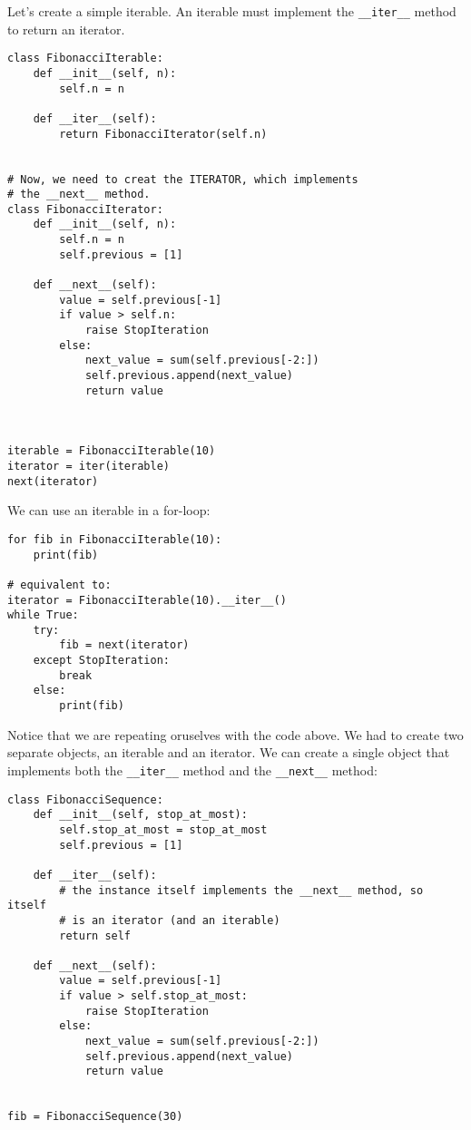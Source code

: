 \documentclass[12pt, a4paper]{article}
\begin{document}
Let's create a simple iterable.
An iterable must implement the \texttt{\_\_iter\_\_} method to return an iterator.
\lstset{language=jupyter-python,label= ,caption= ,captionpos=b,numbers=none}
\begin{lstlisting}
class FibonacciIterable:
    def __init__(self, n):
        self.n = n

    def __iter__(self):
        return FibonacciIterator(self.n)


# Now, we need to creat the ITERATOR, which implements
# the __next__ method.
class FibonacciIterator:
    def __init__(self, n):
        self.n = n
        self.previous = [1]

    def __next__(self):
        value = self.previous[-1]
        if value > self.n:
            raise StopIteration
        else:
            next_value = sum(self.previous[-2:])
            self.previous.append(next_value)
            return value



iterable = FibonacciIterable(10)
iterator = iter(iterable)
next(iterator)
\end{lstlisting}

We can use an iterable in a for-loop:
\lstset{language=jupyter-python,label= ,caption= ,captionpos=b,numbers=none}
\begin{lstlisting}
for fib in FibonacciIterable(10):
    print(fib)

# equivalent to:
iterator = FibonacciIterable(10).__iter__()
while True:
    try:
        fib = next(iterator)
    except StopIteration:
        break
    else:
        print(fib)
\end{lstlisting}

Notice that we are repeating oruselves with the code above.
We had to create two separate objects, an iterable and an iterator.
We can create a single object that implements both the \texttt{\_\_iter\_\_} method and the \texttt{\_\_next\_\_} method:
\lstset{language=jupyter-python,label= ,caption= ,captionpos=b,numbers=none}
\begin{lstlisting}
class FibonacciSequence:
    def __init__(self, stop_at_most):
        self.stop_at_most = stop_at_most
        self.previous = [1]

    def __iter__(self):
        # the instance itself implements the __next__ method, so itself
        # is an iterator (and an iterable)
        return self

    def __next__(self):
        value = self.previous[-1]
        if value > self.stop_at_most:
            raise StopIteration
        else:
            next_value = sum(self.previous[-2:])
            self.previous.append(next_value)
            return value


fib = FibonacciSequence(30)
\end{lstlisting}
\end{document}
